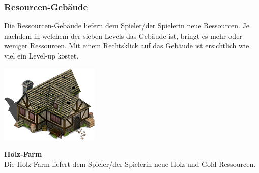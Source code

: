 \documentclass{scrartcl}
\newcommand{\n}{\newline}
\begin{document}
\subsubsection{Resourcen-Gebäude}
Die Ressourcen-Gebäude liefern dem Spieler/der Spielerin neue Ressourcen. Je nachdem in welchem der sieben Levels das Gebäude ist, bringt es mehr oder weniger Ressourcen. Mit einem Rechtsklick auf das Gebäude ist ersichtlich wie viel ein Level-up kostet.\n
\n

\begin{minipage}{0.3\textwidth}
	\includegraphics[width=\textwidth]{imgWoodFarm.png}
\end{minipage}
\hfill
\begin{minipage}{0.5\textwidth}
	\textbf{Holz-Farm}\\
	Die Holz-Farm liefert dem Spieler/der Spielerin neue Holz und Gold Ressourcen.\\
\end{minipage}
\end{document}
